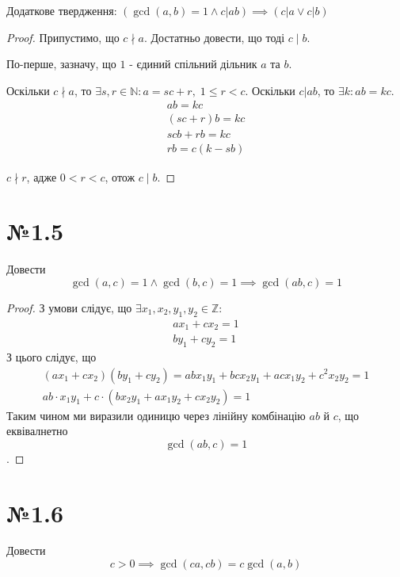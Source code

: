\documentclass[11pt, a4paper]{article} %
\newcommand{\N}{\mathbb{N}}
\newcommand{\Z}{\mathbb{Z}}
\begin{document}
Додаткове твердження: $\left(\gcd(a,b) = 1 \land c|ab \right) \implies \left(c|a \vee c|b\right)$

\begin{mdframed}    
\begin{proof}
    Припустимо, що $c\nmid a$. Достатньо довести, що тоді $c\mid b$.

    По-перше, зазначу, що $1$ - єдиний спільний дільник $a$ та $b$.

    Оскільки $c\nmid a$, то $\exists s,r\in\N: a = sc + r,\; 1 \le r < c$.
    Оскільки $c|ab$, то $\exists k: ab = kc$.
    \begin{gather*}
        ab = kc\\
        (sc + r)b = kc\\
        scb + rb = kc\\
        rb = c(k-sb)
    \end{gather*}

    $c\nmid r$, адже $0<r<c$, отож $c\mid b$.
\end{proof}
\end{mdframed}

\section*{№1.5}
\begin{mdframed}
    Довести
    \[\gcd(a,c)=1 \land \gcd(b,c)=1 \implies \gcd(ab,c)=1\]
\end{mdframed}

\begin{proof}
З умови слідує, що $\exists x_1,x_2,y_1,y_2 \in \Z:$ 
\begin{gather*}
   ax_1 + cx_2 = 1\\
   by_1 + cy_2 = 1
\end{gather*}
З цього слідує, що 
\begin{gather*}
    (ax_1+cx_2)(by_1+cy_2) = abx_1y_1 + bcx_2y_1 + acx_1y_2 + c^2x_2y_2 = 1\\
    ab\cdot x_1y_1 + c \cdot (bx_2y_1 + ax_1y_2 + cx_2y_2) = 1
\end{gather*}
Таким чином ми виразили одиницю через лінійну комбінацію $ab$ й $c$, що еквівалнетно 
\[\gcd(ab,c)=1\]. 
\end{proof}

\newpage
\section*{№1.6}
\begin{mdframed}
    Довести
    \[c>0 \implies \gcd(ca,cb) = c\gcd(a,b)\]
\end{mdframed}
\end{document}
